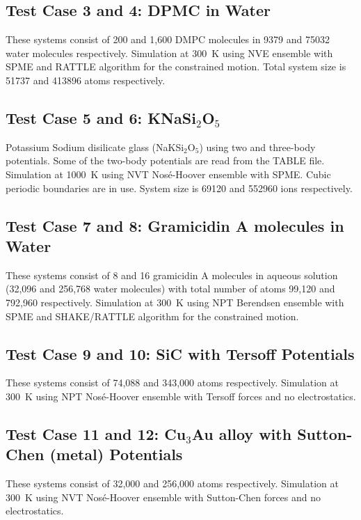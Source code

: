 \subsection{Test Case 3 and 4: DPMC in Water}

These systems consist of 200 and 1,600 DMPC molecules in 9379 and
75032 water molecules respectively.  Simulation at 300~K using NVE
ensemble with SPME and RATTLE algorithm for the constrained motion.
Total system size is 51737 and 413896 atoms respectively.

\subsection{Test Case 5 and 6: KNaSi$_{2}$O$_{5}$}

Potassium Sodium disilicate glass (NaKSi$_{2}$O$_{5}$) using two and
three-body potentials.  Some of the two-body potentials are read
from the TABLE file.  Simulation at 1000~K using NVT Nos\'e-Hoover ensemble
with SPME.  Cubic periodic boundaries are in use. System size is
69120 and 552960 ions respectively.

\subsection{Test Case 7 and 8: Gramicidin A molecules in Water}

These systems consist of 8 and 16 gramicidin A molecules in aqueous
solution (32,096 and 256,768 water molecules) with total number of
atoms 99,120 and 792,960 respectively.  Simulation at 300~K using
NPT Berendsen ensemble with SPME and SHAKE/RATTLE algorithm for the
constrained motion.

\subsection{Test Case 9 and 10: SiC with Tersoff Potentials}

These systems consist of 74,088 and 343,000 atoms respectively.
Simulation at 300~K using NPT Nos\'e-Hoover ensemble with Tersoff forces
and no electrostatics.

\subsection{Test Case 11 and 12: Cu$_{3}$Au alloy with Sutton-Chen (metal) Potentials}

These systems consist of 32,000 and 256,000 atoms respectively.
Simulation at 300~K using NVT Nos\'e-Hoover ensemble with Sutton-Chen forces and
no electrostatics.

